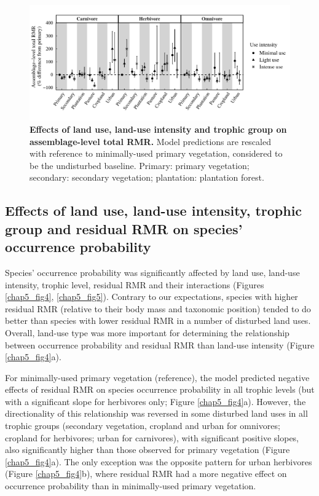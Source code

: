 \clearpage

\begin{figure}[t!]
\centering
\includegraphics[scale=0.75]{figures/Chapter5/Figure3}
\caption[Effects of land use, land-use intensity and trophic group on assemblage-level total RMR.]{\textbf{Effects of land use, land-use intensity and trophic group on assemblage-level total RMR.} Model predictions are rescaled with reference to minimally-used primary vegetation, considered to be the undisturbed baseline. Primary: primary vegetation; secondary: secondary vegetation; plantation: plantation forest. }
\label{chap5_fig3}
\end{figure}


\subsection{Effects of land use, land-use intensity, trophic group and residual RMR on species’ occurrence probability}

Species’ occurrence probability was significantly affected by land use, land-use intensity, trophic level, residual RMR and their interactions (Figures \ref{chap5_fig4}, \ref{chap5_fig5}). Contrary to our expectations, species with higher residual RMR (relative to their body mass and taxonomic position) tended to do better than species with lower residual RMR in a number of disturbed land uses. Overall, land-use type was more important for determining the relationship between occurrence probability and residual RMR than land-use intensity (Figure \ref{chap5_fig4}a).

For minimally-used primary vegetation (reference), the model predicted negative effects of residual RMR on species occurrence probability in all trophic levels (but with a significant slope for herbivores only; Figure \ref{chap5_fig4}a). However, the directionality of this relationship was reversed in some disturbed land uses in all trophic groups (secondary vegetation, cropland and urban for omnivores; cropland for herbivores; urban for carnivores), with significant positive slopes, also significantly higher than those observed for primary vegetation (Figure \ref{chap5_fig4}a). The only exception was the opposite pattern for urban herbivores (Figure \ref{chap5_fig4}b), where residual RMR had a more negative effect on occurrence probability than in minimally-used primary vegetation.
 
